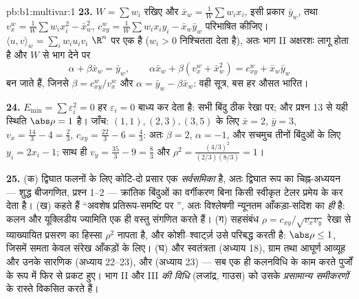 \begin{solution}{pb:b1:multivar:1}
\textbf{23.} $W = \sum w_i$ रखिए और $\bar x_w = \frac1W\sum w_ix_i$, इसी
प्रकार $\bar y_w$, तथा $v_x^w = \frac1W\sum w_ix_i^2 - \bar x_w^2$, $c^w_{xy}
= \frac1W\sum w_ix_iy_i - \bar x_w\bar y_w$ परिभाषित कीजिए। 
$\langle u, v\rangle_w = \sum_i w_iu_iv_i$ $\R^n$ पर एक  है
($w_i > 0$ निश्चितता देता है), अतः भाग II अक्षरशः लागू होता है और
 $W$ से भाग देने पर
\[
\alpha + \beta\bar x_w = \bar y_w,
\qquad
\alpha\bar x_w + \beta(v^w_x + \bar x_w^2) = c^w_{xy} + \bar
x_w\bar y_w
\]
बन जाते हैं, जिनसे $\beta = c^w_{xy}/v^w_x$ और $\alpha = \bar y_w -
\beta\bar x_w$: वही सूत्र, बस हर औसत भारित।

\textbf{24.} $E_{\min} = \sum\varepsilon_i^2 = 0$ हर $\varepsilon_i = 0$
बाध्य कर देता है: सभी बिंदु ठीक रेखा पर; और प्रश्न 13 से यही स्थिति
$\abs\rho = 1$ है। जाँच: $(1,1), (2,3), (3,5)$ के लिए $\bar x = 2$, $\bar
y = 3$, $v_x = \frac{14}3 - 4 = \frac23$, $c_{xy} = \frac{22}3 - 6 =
\frac43$: अतः $\beta = 2$, $\alpha = -1$, और सचमुच तीनों बिंदुओं के लिए
$y_i = 2x_i - 1$; साथ ही $v_y = \frac{35}3 - 9 = \frac83$ और $\rho^2 =
\frac{(4/3)^2}{(2/3)(8/3)} = 1$।

\textbf{25.} (क) द्विघात फलनों के लिए कोटि-दो प्रसार एक \emph{सर्वसमिका}
है, अतः द्विघात रूप का चिह्न-अध्ययन --- शुद्ध बीजगणित, प्रश्न 1--2 ---
क्रांतिक बिंदुओं का वर्गीकरण बिना किसी स्वीकृत टेलर प्रमेय के कर देता है।
(ख)  कहते हैं ``अवशेष प्रतिरूप-समष्टि पर '', अतः
विश्लेषणी न्यूनतम आँकड़ा-सदिश का  \emph{ही} है: कलन और
यूक्लिडीय ज्यामिति एक ही वस्तु संगणित करते हैं। (ग) सहसंबंध $\rho =
c_{xy}/\sqrt{v_xv_y}$ रेखा से व्याख्यायित प्रसरण का हिस्सा $\rho^2$ नापता
है, और कोशी--श्वार्ट्ज़ उसे परिबद्ध करती है: $\abs\rho \leq 1$, जिसमें समता
केवल संरेख आँकड़ों के लिए। (घ)  और स्वतंत्रता (अध्याय 18), ग्राम तथा
आघूर्ण आव्यूह और उनके सारणिक (अध्याय 22--23), और  (अध्याय
23) --- सब एक ही कलनविधि के काम करते पुर्जों के रूप में फिर से प्रकट हुए।
भाग II और III \emph{ की विधि} (लजांद्र, गाउस) को उसके
\emph{प्रसामान्य समीकरणों} के रास्ते विकसित करते हैं।
\end{solution}
